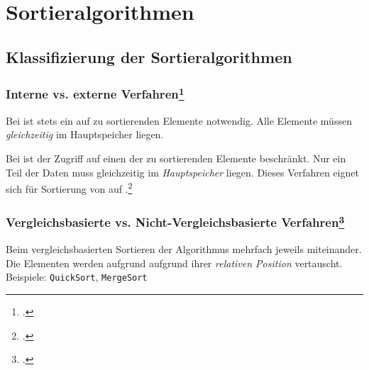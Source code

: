 \documentclass{bschlangaul-theorie}
\begin{document}

\chapter{Sortieralgorithmen}

\begin{liQuellen}
\cite{wiki:sortierverfahren}
\end{liQuellen}

\section{Klassifizierung der Sortieralgorithmen}

%

\subsection{Interne vs. externe Verfahren\footcite[Seite 34]{aud:fs:tafeluebung-11}}

Bei  ist stets ein  auf  zu sortierenden Elemente notwendig. Alle
Elemente müssen \emph{gleichzeitig} im Hauptspeicher liegen.

Bei  ist der Zugriff auf einen
 der zu sortierenden Elemente beschränkt. Nur ein Teil der
Daten muss gleichzeitig im \emph{Hauptspeicher} liegen. Dieses Verfahren
eignet sich für Sortierung von  auf .\footcite[Seite 124]{saake}

%

\subsection{Vergleichsbasierte vs. Nicht-Vergleichsbasierte Verfahren\footcite[Seite
35]{aud:fs:tafeluebung-11}}

Beim vergleichsbasierten Sortieren  der Algorithmus
mehrfach jeweils  miteinander. Die Elementen werden
aufgrund aufgrund ihrer \emph{relativen Position} vertauscht. Beispiele:
\verb|QuickSort|, \verb|MergeSort|
\end{document}
